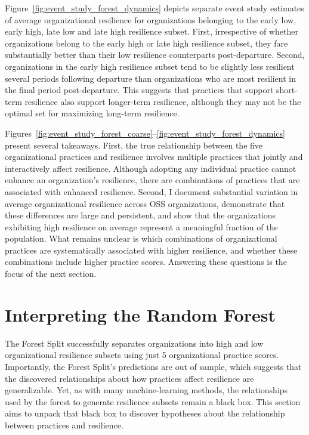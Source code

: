 \documentclass[12pt,notitlepage]{article}
\begin{document}


Figure~\ref{fig:event_study_forest_dynamics} depicts separate event study estimates of average organizational resilience for organizations belonging to the early low, early high, late low and late high resilience subset.
First, irrespective of whether organizations belong to the early high or late high resilience subset, they fare substantially better than their low resilience counterparts post-departure. 
Second, organizations in the early high resilience subset tend to be slightly less resilient several periods following departure than organizations who are most resilient in the final period post-departure. 
This suggests that practices that support short-term resilience also support longer-term resilience, although they may not be the optimal set for maximizing long-term resilience.

Figures~\ref{fig:event_study_forest_coarse}--\ref{fig:event_study_forest_dynamics} present several takeaways.
First, the true relationship between the five organizational practices and resilience involves multiple practices that jointly and interactively affect resilience. 
Although adopting any individual practice cannot enhance an organization's resilience, there are combinations of practices that are associated with enhanced resilience.
Second, I document substantial variation in average organizational resilience across OSS organizations, demonstrate that these differences are large and persistent, and show that the organizations exhibiting high resilience on average represent a meaningful fraction of the population.
What remains unclear is which combinations of organizational practices are systematically associated with higher resilience, and whether these combinations include higher practice scores.
Answering these questions is the focus of the next section. 

\section{Interpreting the Random Forest} \label{sec:interp_forest}
The Forest Split successfully separates organizations into high and low organizational resilience subsets using just 5 organizational practice scores. 
Importantly, the Forest Split's predictions are out of sample, which suggests that the discovered relationships about how practices affect resilience are generalizable. 
Yet, as with many machine-learning methods, the relationships used by the forest to generate resilience subsets remain a black box. 
This section aims to unpack that black box to discover hypotheses about the relationship between practices and resilience.
\end{document}
